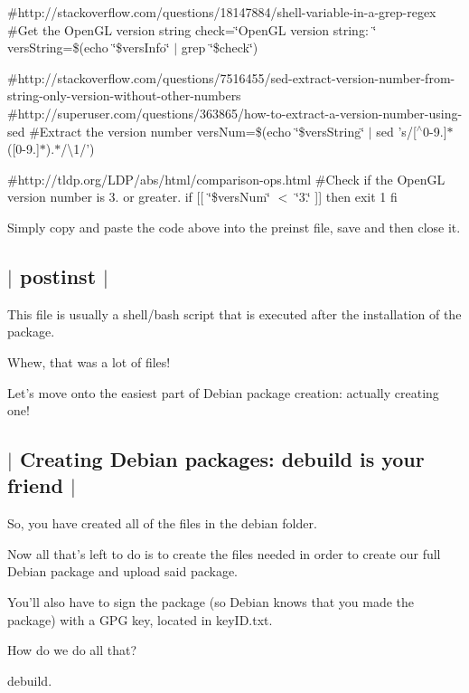 \#http\-://stackoverflow.com/questions/18147884/shell-\/variable-\/in-\/a-\/grep-\/regex \#\-Get the Open\-G\-L version string check=\char`\"{}\-Open\-G\-L version string\-: \char`\"{} vers\-String=\$(echo \char`\"{}\$vers\-Info\char`\"{} $\vert$ grep \char`\"{}\$check\char`\"{})

\#http\-://stackoverflow.com/questions/7516455/sed-\/extract-\/version-\/number-\/from-\/string-\/only-\/version-\/without-\/other-\/numbers \#http\-://superuser.com/questions/363865/how-\/to-\/extract-\/a-\/version-\/number-\/using-\/sed \#\-Extract the version number vers\-Num=\$(echo \char`\"{}\$vers\-String\char`\"{} $\vert$ sed 's/\mbox{[}$^\wedge$0-\/9.\mbox{]}$\ast$(\mbox{[}0-\/9.\mbox{]}$\ast$).$\ast$/\textbackslash{}1/')

\#http\-://tldp.org/\-L\-D\-P/abs/html/comparison-\/ops.\-html \#\-Check if the Open\-G\-L version number is 3. or greater. if \mbox{[}\mbox{[} \char`\"{}\$vers\-Num\char`\"{} $<$ \char`\"{}3.\char`\"{} \mbox{]}\mbox{]} then exit 1 fi

Simply copy and paste the code above into the preinst file, save and then close it. 

 \subsection*{$\vert$ postinst $\vert$ }

This file is usually a shell/bash script that is executed after the installation of the package.

Whew, that was a lot of files!

Let's move onto the easiest part of Debian package creation\-: actually creating one! 

 \subsection*{$\vert$ Creating Debian packages\-: debuild is your friend $\vert$ }

So, you have created all of the files in the debian folder.

Now all that's left to do is to create the files needed in order to create our full Debian package and upload said package.

You'll also have to sign the package (so Debian knows that you made the package) with a G\-P\-G key, located in key\-I\-D.\-txt.

How do we do all that?

debuild.

